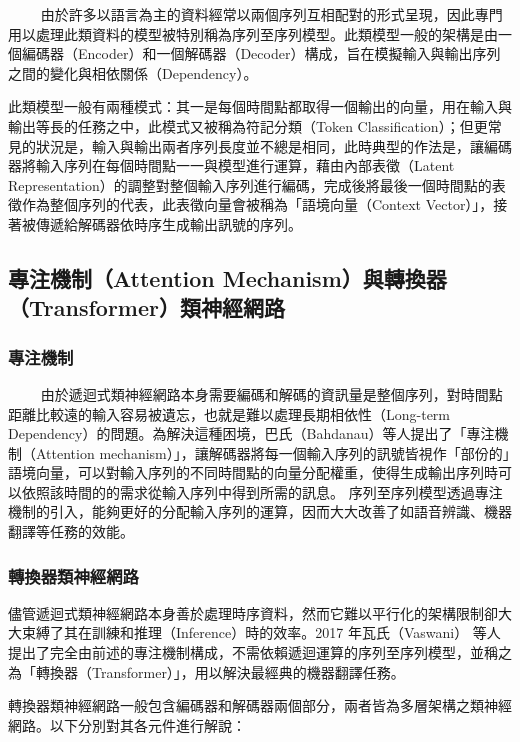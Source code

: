 　　
由於許多以語言為主的資料經常以兩個序列互相配對的形式呈現，因此專門用以處理此類資料的模型被特別稱為序列至序列模型。此類模型一般的架構是由一個編碼器（Encoder）和一個解碼器（Decoder）構成，旨在模擬輸入與輸出序列之間的變化與相依關係（Dependency）。

此類模型一般有兩種模式：其一是每個時間點都取得一個輸出的向量，用在輸入與輸出等長的任務之中，此模式又被稱為符記分類（Token Classification）；但更常見的狀況是，輸入與輸出兩者序列長度並不總是相同，此時典型的作法是，讓編碼器將輸入序列在每個時間點一一與模型進行運算，藉由內部表徵（Latent Representation）的調整對整個輸入序列進行編碼，完成後將最後一個時間點的表徵作為整個序列的代表，此表徵向量會被稱為「語境向量（Context Vector）」，接著被傳遞給解碼器依時序生成輸出訊號的序列。

\subsection{專注機制（Attention Mechanism）與轉換器（Transformer）類神經網路}

\subsubsection{專注機制}

　　
由於遞迴式類神經網路本身需要編碼和解碼的資訊量是整個序列，對時間點距離比較遠的輸入容易被遺忘，也就是難以處理長期相依性（Long-term Dependency）的問題。為解決這種困境，巴氏（Bahdanau）等人提出了「專注機制（Attention mechanism）」\cite{bahdanau2014neural}，讓解碼器將每一個輸入序列的訊號皆視作「部份的」語境向量，可以對輸入序列的不同時間點的向量分配權重，使得生成輸出序列時可以依照該時間的的需求從輸入序列中得到所需的訊息。
序列至序列模型透過專注機制的引入，能夠更好的分配輸入序列的運算，因而大大改善了如語音辨識、機器翻譯等任務的效能。

\subsubsection{轉換器類神經網路}

儘管遞迴式類神經網路本身善於處理時序資料，然而它難以平行化的架構限制卻大大束縛了其在訓練和推理（Inference）時的效率。2017 年瓦氏（Vaswani） 等人 \cite{vaswani2017attention} 提出了完全由前述的專注機制構成，不需依賴遞迴運算的序列至序列模型，並稱之為「轉換器（Transformer）」，用以解決最經典的機器翻譯任務。

轉換器類神經網路一般包含編碼器和解碼器兩個部分，兩者皆為多層架構之類神經網路。以下分別對其各元件進行解說：

